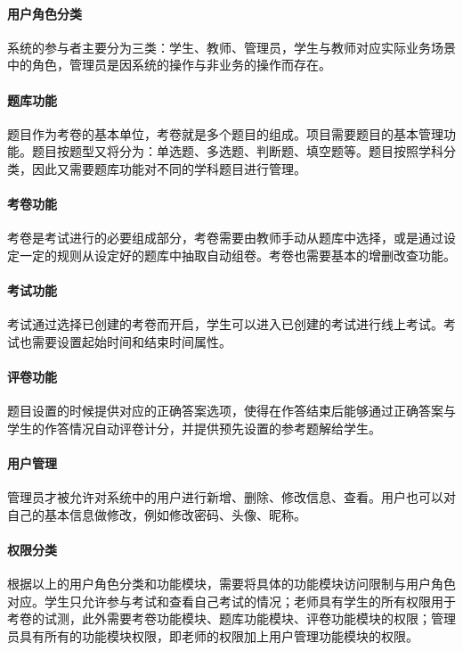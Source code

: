 \paragraph{用户角色分类} 系统的参与者主要分为三类：学生、教师、管理员，学生与教师对应实际业务场景中的角色，管理员是因系统的操作与非业务的操作而存在。
\paragraph{题库功能} 题目作为考卷的基本单位，考卷就是多个题目的组成。项目需要题目的基本管理功能。题目按题型又将分为：单选题、多选题、判断题、填空题等。题目按照学科分类，因此又需要题库功能对不同的学科题目进行管理。
\paragraph{考卷功能} 考卷是考试进行的必要组成部分，考卷需要由教师手动从题库中选择，或是通过设定一定的规则从设定好的题库中抽取自动组卷。考卷也需要基本的增删改查功能。
\paragraph{考试功能} 考试通过选择已创建的考卷而开启，学生可以进入已创建的考试进行线上考试。考试也需要设置起始时间和结束时间属性。
\paragraph{评卷功能} 题目设置的时候提供对应的正确答案选项，使得在作答结束后能够通过正确答案与学生的作答情况自动评卷计分，并提供预先设置的参考题解给学生。
\paragraph{用户管理} 管理员才被允许对系统中的用户进行新增、删除、修改信息、查看。用户也可以对自己的基本信息做修改，例如修改密码、头像、昵称。
\paragraph{权限分类} 根据以上的用户角色分类和功能模块，需要将具体的功能模块访问限制与用户角色对应。学生只允许参与考试和查看自己考试的情况；老师具有学生的所有权限用于考卷的试测，此外需要考卷功能模块、题库功能模块、评卷功能模块的权限；管理员具有所有的功能模块权限，即老师的权限加上用户管理功能模块的权限。

